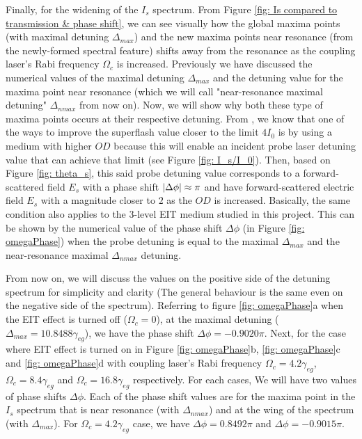 Finally, for the widening of the $I_{s}$ spectrum. From Figure \ref{fig: Is compared to transmission & phase shift}, we can see visually how the global maxima points (with maximal detuning $\Delta_{max}$) and the new maxima points near resonance (from the newly-formed spectral feature) shifts away from the resonance as the coupling laser's Rabi frequency $\Omega_{c}$ is increased. Previously we have discussed the numerical values of the maximal detuning $\Delta_{max}$ and the detuning value for the maxima point near resonance (which we will call "near-resonance maximal detuning" $\Delta_{nmax}$ from now on). Now, we will show why both these type of maxima points occurs at their respective detuning. From \cite{Kwong2014, Kwong2017}, we know that one of the ways to improve the superflash value closer to the limit $4I_{0}$ is by using a medium with higher $OD$ because this will enable an incident probe laser detuning value that can achieve that limit (see Figure \ref{fig: I_s/I_0}). Then, based on Figure \ref{fig: theta_s}, this said probe detuning value corresponds to a forward-scattered field $E_{s}$ with a phase shift $\abs{\Delta\phi} \approx \pi$ and have forward-scattered electric field $E_{s}$ with a magnitude closer to $2$ as the $OD$ is increased. Basically, the same condition also applies to the 3-level EIT medium studied in this project. This can be shown by the numerical value of the phase shift $\Delta\phi$  (in Figure \ref{fig: omegaPhase}) when the probe detuning is equal to the maximal $\Delta_{max}$ and the near-resonance maximal $\Delta_{nmax}$ detuning.

From now on, we will discuss the values on the positive side of the detuning spectrum for simplicity and clarity (The general behaviour is the same even on the negative side of the spectrum). Referring to figure \ref{fig: omegaPhase}a when the EIT effect is turned off ($\Omega_{c} = 0$), at the maximal detuning ($\Delta_{max} = 10.8488\gamma_{eg}$), we have the phase shift $\Delta\phi = -0.9020\pi$. Next, for the case where EIT effect is turned on in Figure \ref{fig: omegaPhase}b, \ref{fig: omegaPhase}c and \ref{fig: omegaPhase}d with coupling laser's Rabi frequency $\Omega_{c} = 4.2\gamma_{eg}$, $\Omega_{c} = 8.4\gamma_{eg}$ and $\Omega_{c} = 16.8\gamma_{eg}$ respectively. For each cases, We will have two values of phase shifts $\Delta\phi$. Each of the phase shift values are for the maxima point in the $I_{s}$ spectrum that is near resonance (with $\Delta_{nmax}$) and at the wing of the spectrum (with $\Delta_{max}$). For $\Omega_{c} = 4.2\gamma_{eg}$ case, we have $\Delta\phi = 0.8492\pi$ and $\Delta\phi = -0.9015\pi$.  

